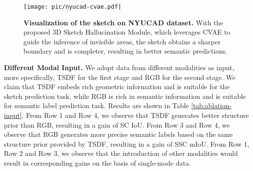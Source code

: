 \documentclass[10pt,twocolumn,letterpaper]{article}
\begin{document}
\begin{table}[t]
\begin{center}
\vspace{-0.35cm}
\end{center}
\caption{\textbf{Ablation studies on different modal input}. We perform this ablation study on NYU dataset.}
\label{tab:ablation-input}
\end{table} 
\begin{figure*}[ht]
\centering
\texttt{[image: pic/nyucad-cvae.pdf]}
\caption{\textbf{Visualization of the sketch on NYUCAD dataset.} With the proposed 3D Sketch Hallucination Module, which leverages CVAE to guide the inference of invisible areas, the sketch obtains a sharper boundary and is completer, resulting in better semantic predictions.}
\label{fig:nyucad-cvae}
\end{figure*}


\noindent \textbf{Different Modal Input.} We adopt data from different modalities as input, more specifically, TSDF for the first stage and RGB for the second stage. We claim that TSDF embeds rich geometric information and is suitable for the sketch prediction task, while RGB is rich in semantic information and is suitable for semantic label prediction task. Results are shown in Table \ref{tab:ablation-input}. From Row 1 and Row 4, we observe that TSDF generates better structure prior than RGB, resulting in a gain of  SC IoU. From Row 3 and Row 4, we observe that RGB generates more precise semantic labels based on the same structure prior provided by TSDF, resulting in a gain of  SSC mIoU. From Row 1, Row 2 and Row 3, we observe that the introduction of other modalities would result in corresponding gains on the basis of single-mode data.
\end{document}
